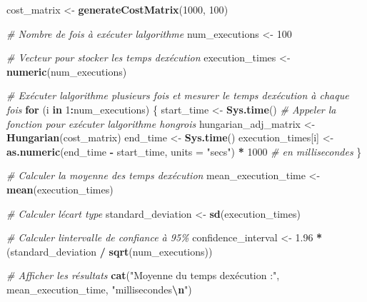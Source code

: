 \documentclass[
]{article}
\newenvironment{Shaded}{\begin{snugshade}}{\end{snugshade}}
\newcommand{\AttributeTok}[1]{\textcolor[rgb]{0.13,0.29,0.53}{#1}}
\newcommand{\CommentTok}[1]{\textcolor[rgb]{0.56,0.35,0.01}{\textit{#1}}}
\newcommand{\ControlFlowTok}[1]{\textcolor[rgb]{0.13,0.29,0.53}{\textbf{#1}}}
\newcommand{\DecValTok}[1]{\textcolor[rgb]{0.00,0.00,0.81}{#1}}
\newcommand{\FloatTok}[1]{\textcolor[rgb]{0.00,0.00,0.81}{#1}}
\newcommand{\FunctionTok}[1]{\textcolor[rgb]{0.13,0.29,0.53}{\textbf{#1}}}
\newcommand{\NormalTok}[1]{#1}
\newcommand{\OtherTok}[1]{\textcolor[rgb]{0.56,0.35,0.01}{#1}}
\newcommand{\SpecialCharTok}[1]{\textcolor[rgb]{0.81,0.36,0.00}{\textbf{#1}}}
\newcommand{\StringTok}[1]{\textcolor[rgb]{0.31,0.60,0.02}{#1}}
\begin{document}
\begin{Shaded}
\begin{Highlighting}[]
\NormalTok{cost\_matrix }\OtherTok{\textless{}{-}} \FunctionTok{generateCostMatrix}\NormalTok{(}\DecValTok{1000}\NormalTok{, }\DecValTok{100}\NormalTok{)}

\CommentTok{\# Nombre de fois à exécuter l\textquotesingle{}algorithme}
\NormalTok{num\_executions }\OtherTok{\textless{}{-}} \DecValTok{100}

\CommentTok{\# Vecteur pour stocker les temps d\textquotesingle{}exécution}
\NormalTok{execution\_times }\OtherTok{\textless{}{-}} \FunctionTok{numeric}\NormalTok{(num\_executions)}

\CommentTok{\# Exécuter l\textquotesingle{}algorithme plusieurs fois et mesurer le temps d\textquotesingle{}exécution à chaque fois}
\ControlFlowTok{for}\NormalTok{ (i }\ControlFlowTok{in} \DecValTok{1}\SpecialCharTok{:}\NormalTok{num\_executions) \{}
\NormalTok{  start\_time }\OtherTok{\textless{}{-}} \FunctionTok{Sys.time}\NormalTok{()}
  \CommentTok{\# Appeler la fonction pour exécuter l\textquotesingle{}algorithme hongrois}
\NormalTok{  hungarian\_adj\_matrix }\OtherTok{\textless{}{-}} \FunctionTok{Hungarian}\NormalTok{(cost\_matrix)}
\NormalTok{  end\_time }\OtherTok{\textless{}{-}} \FunctionTok{Sys.time}\NormalTok{()}
\NormalTok{  execution\_times[i] }\OtherTok{\textless{}{-}} \FunctionTok{as.numeric}\NormalTok{(end\_time }\SpecialCharTok{{-}}\NormalTok{ start\_time, }\AttributeTok{units =} \StringTok{"secs"}\NormalTok{) }\SpecialCharTok{*} \DecValTok{1000}  \CommentTok{\# en millisecondes}
\NormalTok{\}}

\CommentTok{\# Calculer la moyenne des temps d\textquotesingle{}exécution}
\NormalTok{mean\_execution\_time }\OtherTok{\textless{}{-}} \FunctionTok{mean}\NormalTok{(execution\_times)}

\CommentTok{\# Calculer l\textquotesingle{}écart type}
\NormalTok{standard\_deviation }\OtherTok{\textless{}{-}} \FunctionTok{sd}\NormalTok{(execution\_times)}

\CommentTok{\# Calculer l\textquotesingle{}intervalle de confiance à 95\%}
\NormalTok{confidence\_interval }\OtherTok{\textless{}{-}} \FloatTok{1.96} \SpecialCharTok{*}\NormalTok{ (standard\_deviation }\SpecialCharTok{/} \FunctionTok{sqrt}\NormalTok{(num\_executions))}

\CommentTok{\# Afficher les résultats}
\FunctionTok{cat}\NormalTok{(}\StringTok{"Moyenne du temps d\textquotesingle{}exécution :"}\NormalTok{, mean\_execution\_time, }\StringTok{"millisecondes}\SpecialCharTok{\textbackslash{}n}\StringTok{"}\NormalTok{)}
\end{Highlighting}
\end{Shaded}
\end{document}

